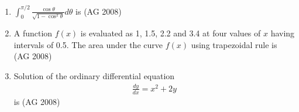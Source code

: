 \begin{enumerate}[label=\thesubsection.\arabic*,ref=\thesubsection.\theenumi]
\hfill(AE 2008)
\begin{enumerate}
\end{enumerate}
\item  
$ \int_0^{\pi/2} \frac{\cos \theta }{\sqrt{1 - \cos^2 \theta}} d\theta $ is 
\hfill(AG 2008)
\begin{enumerate}
\end{enumerate}
\item 
 A function $f(x)$ is evaluated as 1, 1.5, 2.2 and 3.4 at four values of $x$ having intervals of 0.5. The area under the curve $f(x)$ using trapezoidal rule is 
\hfill(AG 2008)
\begin{enumerate}
 \end{enumerate}
\item 
 Solution of the ordinary differential equation 
 \begin{align*}
\frac{dy}{dx} = x^2 + 2y  
 \end{align*} is
\hfill(AG 2008)
\begin{enumerate}

\end{enumerate}
\end{enumerate}
